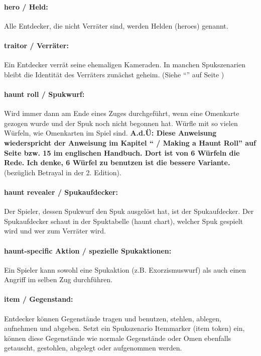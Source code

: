 \paragraph{hero / Held:} Alle Entdecker, die nicht Verräter sind, werden Helden (heroes) genannt.

\paragraph{traitor / Verräter:} Ein Entdecker verrät seine ehemaligen Kameraden. In manchen Spukszenarien bleibt die Identität des Verräters zunächst geheim. (Siehe ``'' auf Seite \pageref{kap:rule:hiddentraitor})


\paragraph{haunt roll / Spukwurf:} Wird immer dann am Ende eines Zuges durchgeführt, wenn eine Omenkarte gezogen wurde und der Spuk noch nicht begonnen hat. Würfle mit so vielen Würfeln, wie Omenkarten im Spiel sind. \textbf{A.d.Ü: Diese Anweisung wiederspricht der Anweisung im Kapitel `` / Making a Haunt Roll'' auf Seite \pageref{kap:rule:makehauntroll} bzw. 15 im englischen Handbuch. Dort ist von 6 Würfeln die Rede. Ich denke, 6 Würfel zu benutzen ist die bessere Variante.} (bezüglich Betrayal in der 2. Edition).

\paragraph{haunt revealer / Spukaufdecker:} Der Spieler, dessen Spukwurf den Spuk ausgelöst hat, ist der Spukaufdecker. Der Spukaufdecker schaut in der Spuktabelle (haunt chart), welcher Spuk gespielt wird und wer zum Verräter wird.

\paragraph{haunt-specific Aktion / spezielle Spukaktionen:} Ein Spieler kann sowohl eine Spukaktion (z.B. Exorzismuswurf) als auch einen Angriff im selben Zug durchführen.

\paragraph{item / Gegenstand:} Entdecker können Gegenstände tragen und benutzen, stehlen, ablegen, aufnehmen und abgeben. Setzt ein Spukszenario Itemmarker (item token) ein, können diese Gegenstände wie normale Gegenstände oder Omen ebenfalls getauscht, gestohlen, abgelegt oder aufgenommen werden.

